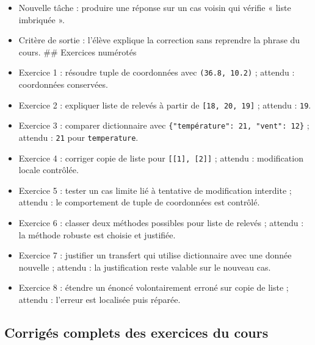 \begin{itemize}
\item
  Nouvelle tâche : produire une réponse sur un cas voisin qui vérifie «
  liste imbriquée ».
\item
  Critère de sortie : l'élève explique la correction sans reprendre la
  phrase du cours. \#\# Exercices numérotés
\item
  Exercice 1 : résoudre tuple de coordonnées avec \texttt{(36.8,\ 10.2)}
  ; attendu : coordonnées conservées.
\item
  Exercice 2 : expliquer liste de relevés à partir de
  \texttt{{[}18,\ 20,\ 19{]}} ; attendu : \texttt{19}.
\item
  Exercice 3 : comparer dictionnaire avec
  \texttt{\{"température":\ 21,\ "vent":\ 12\}} ; attendu : \texttt{21}
  pour \texttt{temperature}.
\item
  Exercice 4 : corriger copie de liste pour
  \texttt{{[}{[}1{]},\ {[}2{]}{]}} ; attendu : modification locale
  contrôlée.
\item
  Exercice 5 : tester un cas limite lié à tentative de modification
  interdite ; attendu : le comportement de tuple de coordonnées est
  contrôlé.
\item
  Exercice 6 : classer deux méthodes possibles pour liste de relevés ;
  attendu : la méthode robuste est choisie et justifiée.
\item
  Exercice 7 : justifier un transfert qui utilise dictionnaire avec une
  donnée nouvelle ; attendu : la justification reste valable sur le
  nouveau cas.
\item
  Exercice 8 : étendre un énoncé volontairement erroné sur copie de
  liste ; attendu : l'erreur est localisée puis réparée.
\end{itemize}

\subsection{Corrigés complets des exercices du cours}

